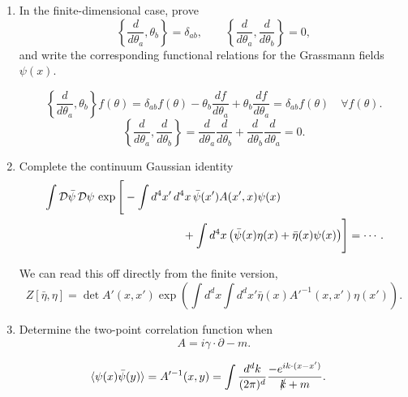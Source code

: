 \begin{enumerate}[label=\alph*),resume]
    \item In the finite-dimensional case, prove
    \begin{equation}
        \left\{\frac{d}{d\theta_a},\theta_b\right\}=\delta_{ab},
        \qquad
        \left\{\frac{d}{d\theta_a},\frac{d}{d\theta_b}\right\}=0,
    \end{equation}
    and write the corresponding functional relations for the Grassmann fields
    $\psi(x)$.
    \begin{solution}
        \begin{equation}
            \left\{\frac{d}{d\theta_a},\theta_b\right\}f(\theta) = \delta_{ab}f(\theta) - \theta_b \frac{df}{d\theta_a} + \theta_b \frac{df}{d\theta_a} = \delta_{ab}f(\theta) \quad \forall f(\theta).
        \end{equation}
        \begin{equation}
            \left\{\frac{d}{d\theta_a},\frac{d}{d\theta_b}\right\} = \frac{d}{d\theta_a}\frac{d}{d\theta_b} + \frac{d}{d\theta_b}\frac{d}{d\theta_a} = 0.
        \end{equation}
    \end{solution}

    \item Complete the continuum Gaussian identity
    \begin{equation}
        \begin{aligned}
        &\int\mathcal{D}\bar\psi\,\mathcal{D}\psi\,
        \exp\Bigg[
            -\int d^4x'\,d^4x\,
                \bar\psi(x')A(x',x)\psi(x) \\
        &\hspace{43mm}
            +\int d^4x\,
                \bigl(\bar\psi(x)\eta(x)+\bar\eta(x)\psi(x)\bigr)
        \Bigg]
        =\cdots .
        \end{aligned}
    \end{equation}
    \begin{solution}
         We can read this off directly from the finite version,
         \begin{equation}
             Z[\bar \eta,\eta ] = \det A'(x,x') \exp\left(\int d^dx \int d^dx'\bar \eta(x) A'^{-1}(x,x')\eta(x')\right).
         \end{equation}
    \end{solution}

    \item Determine the two-point correlation function when
    \begin{equation}
        A=i\gamma\cdot\partial-m.
    \end{equation}
    \begin{solution}
        \begin{equation}
        \begin{aligned}
            \langle \psi(x) \bar \psi(y)\rangle &= A'^{-1}(x,y) =\int \frac{d^dk}{(2\pi)^d}\frac{-e^{ik\cdot(x-x')}}{\slashed{k} + m}.
        \end{aligned}
        \end{equation}
    \end{solution}
\end{enumerate}

